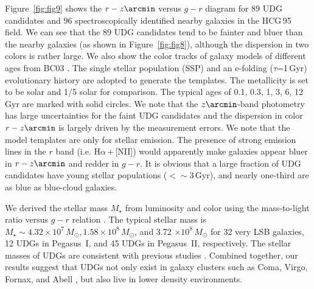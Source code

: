 \documentclass[twocolumn,trackchanges]{aastex61}
\begin{document}
Figure~\ref{fig:fig9} shows the $r-z\arcmin$ versus $g-r$ diagram for 89 UDG candidates and 96 spectroscopically identified nearby galaxies in the HCG\,95 field. We can see that the 89 UDG candidates tend to be fainter and bluer than the nearby galaxies (as shown in Figure~\ref{fig:fig8}), although the dispersion in two colors is rather large. We also show the color tracks of galaxy models of different ages from BC03 \citep{Bruzual2003}. The single stellar population (SSP) and an e-folding ($\tau$=1\,Gyr) evolutionary history are adopted to generate the templates. The metallicity is set to be solar and 1/5 solar for comparison. The typical ages of 0.1, 0.3, 1, 3, 6, 12\,Gyr are marked with solid circles. We note that the $z\arcmin$-band photometry has large uncertainties for the faint UDG candidates and the dispersion in color $r-z\arcmin$ is largely driven by the measurement errors. We note that the model templates are only for stellar emission. The presence of strong emission lines in the $r$ band (i.e. H$\alpha$\,+\,[NII]) would apparently make galaxies appear bluer in $r-z\arcmin$ and redder in $g-r$. It is obvious that a large fraction of UDG candidates have young stellar populations ($<\sim$3\,Gyr), and nearly one-third are as blue as blue-cloud galaxies.                                                            



We derived the stellar mass $M_{\star}$ from luminosity and color using the mass-to-light ratio versus $g-r$ relation \citep{Bell2003,Taylor2011}. The typical stellar mass  is $M_{\star} \sim 4.32 \times 10^{7}\,M_{\odot}, 1.58 \times 10^{8}\,M_{\odot}$, and 3.72 $\times 10^{8}\,M_{\odot}$ for 32 very LSB galaxies, 12 UDGs in Pegasus~I, and 45 UDGs in Pegasus~II, respectively. The stellar masses of UDGs are consistent with previous studies \citep{van Dokkum2015a,Roman2017,RomanTrujillo2016}. 
Combined together, our results  suggest that UDGs not only exist in galaxy clusters such as Coma, Virgo, Fornax, and Abell \citep{Mihos2015,Munoz2015,Koda2015,van Dokkum2015a,van Dokkum2015b,Martinez-Delgado2016,Janssens2017}, but also live  in lower density environments. 
\end{document}
